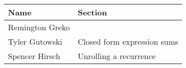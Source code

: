 \documentclass{article}
\begin{document}
\pagebreak

\begin{center}
        \begin{tabular}{|p{3cm}|p{6cm}|}
            \hline
            \textbf{Name} & \textbf{Section} \\
            \hline
            Remington Greko & \\
            \hline
            Tyler Gutowski & Closed form expression sums\\
            \hline
            Spencer Hirsch & Unrolling a recurrence \\
            \hline
        \end{tabular}
    \end{center}
\end{document}
